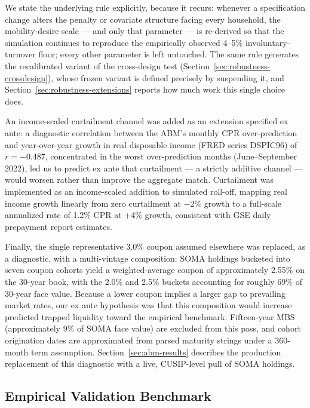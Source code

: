 \documentclass[12pt]{article}
\begin{document}
We state the underlying rule explicitly, because it recurs: whenever a specification change alters the penalty or covariate structure facing every household, the mobility-desire scale --- and only that parameter --- is re-derived so that the simulation continues to reproduce the empirically observed 4--5\% involuntary-turnover floor; every other parameter is left untouched. The same rule generates the recalibrated variant of the cross-design test (Section~\ref{sec:robustness-crossdesign}), whose frozen variant is defined precisely by suspending it, and Section~\ref{sec:robustness-extensions} reports how much work this single choice does.

An income-scaled curtailment channel was added as an extension specified ex ante: a diagnostic correlation between the ABM's monthly CPR over-prediction and year-over-year growth in real disposable income (FRED series DSPIC96) of $r = -0.487$, concentrated in the worst over-prediction months (June--September 2022), led us to predict ex ante that curtailment --- a strictly additive channel --- would worsen rather than improve the aggregate match. Curtailment was implemented as an income-scaled addition to simulated roll-off, mapping real income growth linearly from zero curtailment at $-2$\% growth to a full-scale annualized rate of 1.2\% CPR at +4\% growth, consistent with GSE daily prepayment report estimates.

Finally, the single representative 3.0\% coupon assumed elsewhere was replaced, as a diagnostic, with a multi-vintage composition: SOMA holdings bucketed into seven coupon cohorts yield a weighted-average coupon of approximately 2.55\% on the 30-year book, with the 2.0\% and 2.5\% buckets accounting for roughly 69\% of 30-year face value. Because a lower coupon implies a larger gap to prevailing market rates, our ex ante hypothesis was that this composition would increase predicted trapped liquidity toward the empirical benchmark. Fifteen-year MBS (approximately 9\% of SOMA face value) are excluded from this pass, and cohort origination dates are approximated from parsed maturity strings under a 360-month term assumption. Section~\ref{sec:abm-results} describes the production replacement of this diagnostic with a live, CUSIP-level pull of SOMA holdings.

\subsection{Empirical Validation Benchmark}\label{sec:method-benchmark}
\end{document}
